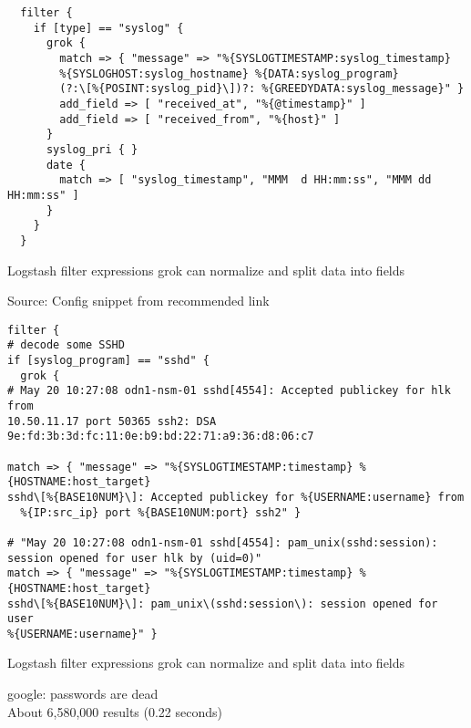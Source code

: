 \documentclass[20pt,landscape,a4paper,footrule]{foils}
\begin{document}

{\footnotesize
\begin{verbatim}
  filter {
    if [type] == "syslog" {
      grok {
        match => { "message" => "%{SYSLOGTIMESTAMP:syslog_timestamp}
        %{SYSLOGHOST:syslog_hostname} %{DATA:syslog_program}
        (?:\[%{POSINT:syslog_pid}\])?: %{GREEDYDATA:syslog_message}" }
        add_field => [ "received_at", "%{@timestamp}" ]
        add_field => [ "received_from", "%{host}" ]
      }
      syslog_pri { }
      date {
        match => [ "syslog_timestamp", "MMM  d HH:mm:ss", "MMM dd HH:mm:ss" ]
      }
    }
  }
\end{verbatim}
}

\begin{list2}
\item Logstash filter expressions grok can normalize and split data into fields
\end{list2}

Source:
Config snippet from recommended link\\
{\small{}}



{\footnotesize
\begin{verbatim}
filter {
# decode some SSHD
if [syslog_program] == "sshd" {
  grok {
# May 20 10:27:08 odn1-nsm-01 sshd[4554]: Accepted publickey for hlk from
10.50.11.17 port 50365 ssh2: DSA 9e:fd:3b:3d:fc:11:0e:b9:bd:22:71:a9:36:d8:06:c7

match => { "message" => "%{SYSLOGTIMESTAMP:timestamp} %{HOSTNAME:host_target}
sshd\[%{BASE10NUM}\]: Accepted publickey for %{USERNAME:username} from
  %{IP:src_ip} port %{BASE10NUM:port} ssh2" }

# "May 20 10:27:08 odn1-nsm-01 sshd[4554]: pam_unix(sshd:session):
session opened for user hlk by (uid=0)"
match => { "message" => "%{SYSLOGTIMESTAMP:timestamp} %{HOSTNAME:host_target}
sshd\[%{BASE10NUM}\]: pam_unix\(sshd:session\): session opened for user
%{USERNAME:username}" }
\end{verbatim}
}

\begin{list2}
\item Logstash filter expressions grok can normalize and split data into fields
\end{list2}



google: passwords are dead\\
About 6,580,000 results (0.22 seconds)
\end{document}
